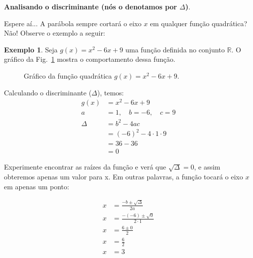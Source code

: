 \documentclass[12pt,openright,twoside,a4paper]{article}
\theoremstyle{definition}
\newtheorem{example}{Exemplo}[section]
\begin{document}
	\textbf{Analisando o discriminante (nós o denotamos por $\Delta$)}.
	
	Espere aí... A parábola sempre cortará o eixo $x$ em qualquer função quadrática? Não! Observe o exemplo a seguir:
	
	\begin{example}
		Seja $g(x) = x^2 - 6x + 9$ uma função definida no conjunto $\mathbb{R}$.
		O gráfico da Fig.~\ref{fig:funcao_quadratica} mostra o comportamento dessa função.
		\begin{figure}[h]
			\centering
			\caption{Gráfico da função quadrática $g(x) = x^2 - 6x + 9$.}
			\label{fig:funcao_quadratica}
		\end{figure}
		
		Calculando o discriminante ($\Delta$), temos:
		\begin{align*}
			g(x) &= x^2 - 6x + 9 \\
			a &= 1, \quad b = -6, \quad c = 9 \\
			\Delta &= b^2 - 4ac \\
			&= (-6)^2 - 4 \cdot 1 \cdot 9 \\
			&= 36 - 36 \\
			&= 0
		\end{align*}
		
		Experimente encontrar as raízes da função e verá que $\sqrt{\Delta} = 0$, e assim obteremos apenas um valor para x. Em outras palavras, a função tocará o eixo $x$ em apenas um ponto:
		
		\begin{align*}
			x &= \frac{-b \pm \sqrt{\Delta}}{2a} \\
			x &= \frac{-(-6) \pm \sqrt{0}}{2 \cdot 1} \\
			x &= \frac{6 \pm 0}{2} \\
			x &= \frac{6}{2} \\
			x &= 3
		\end{align*}
		
	\end{example}
	
\end{document}
